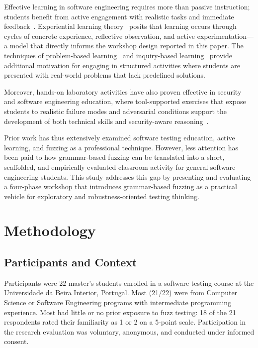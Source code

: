 \documentclass[conference]{IEEEtran}
\begin{document}
Effective learning in software engineering requires more than passive instruction; students benefit from active engagement with realistic tasks and immediate feedback~\cite{kolb1984experiential}.
Experiential learning theory~\cite{kolb1984experiential} posits that learning occurs through cycles of concrete experience, reflective observation, and active experimentation---a model that directly informs the workshop design reported in this paper.
The techniques of problem-based learning~\cite{hmelo2004problem} and inquiry-based learning~\cite{prince2004active} provide additional motivation for engaging in structured activities where students are presented with real-world problems that lack predefined solutions.

Moreover, hands-on laboratory activities have also proven effective in security and software engineering education, where tool-supported exercises that expose students to realistic failure modes and adversarial conditions support the development of both technical skills and security-aware reasoning~\cite{du2011seed}.

Prior work has thus extensively examined software testing education, active learning, and fuzzing as a professional technique. However, less attention has been paid to how grammar-based fuzzing can be translated into a short, scaffolded, and empirically evaluated classroom activity for general software engineering students. This study addresses this gap by presenting and evaluating a four-phase workshop that introduces grammar-based fuzzing as a practical vehicle for exploratory and robustness-oriented testing thinking.

\section{Methodology}
\label{sec:methodology}

\subsection{Participants and Context}

Participants were 22 master's students enrolled in a software testing course at the Universidade da Beira Interior, Portugal.
Most (21/22) were from Computer Science or Software Engineering programs with intermediate programming experience.
Most had little or no prior exposure to fuzz testing: 18 of the 21 respondents rated their familiarity as 1 or 2 on a 5-point scale.
Participation in the research evaluation was voluntary, anonymous, and conducted under informed consent.
\end{document}
